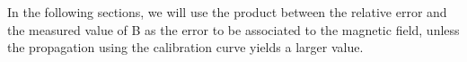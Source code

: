 \documentclass[a4paper,12pt,abstracton]{scrartcl}
\begin{document}
\begin{table}[H]
\centering
\caption{}
\label{disY}
\end{table}

In the following sections, we will use the product between the relative error and the measured value of B as the error to be associated to the magnetic field, unless the propagation using the calibration curve yields a larger value. 
\end{document}

